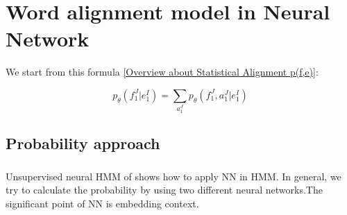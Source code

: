 \documentclass{article}
\begin{document}
\section{Word alignment model in Neural Network}
We start from this formula \eqref{Overview about Statistical Alignment p(f,e)}:

\begin{equation}
p_{\theta}(f_1^J|e_1^I) = \sum_{a_1^J} p_{\theta}(f_1^J, a_1^J|e_1^I)
\label{Word Alignment Model Neural Network p(f,e)}
\end{equation}

\subsection{Probability approach}
\subsubsection{\cite{Tran16unsupervised}}
Unsupervised neural HMM of \cite{Tran16unsupervised} shows how to apply NN in HMM. In general, we try to calculate the probability by using two different neural networks.The significant point of NN is embedding context.
\end{document}

